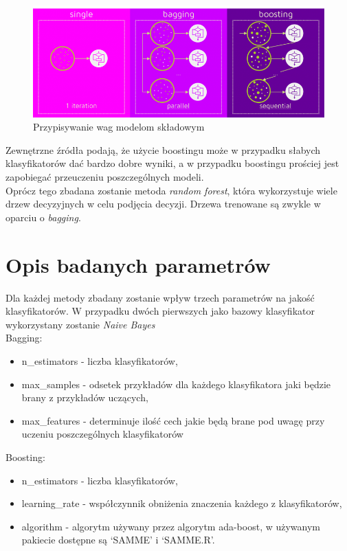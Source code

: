 \documentclass[12pt,a4paper]{article}
\begin{document}
\begin{figure}[H]
\centering
\includegraphics[scale=0.6]{choseWorks.png}
\caption{Przypisywanie wag modelom składowym}
\end{figure}
Zewnętrzne źródła podają, że użycie boostingu może w przypadku słabych klasyfikatorów dać bardzo dobre wyniki, a w przypadku boostingu prościej jest zapobiegać przeuczeniu poszczególnych modeli.\\
Oprócz tego zbadana zostanie metoda \textit{random forest}, która wykorzystuje wiele drzew decyzyjnych w celu podjęcia decyzji. Drzewa trenowane są zwykle w oparciu o \textit{bagging}.

\section{Opis badanych parametrów}
Dla każdej metody zbadany zostanie wpływ trzech parametrów na jakość klasyfikatorów. W przypadku dwóch pierwszych jako bazowy klasyfikator wykorzystany zostanie \textit{Naive Bayes}\\

Bagging:
\begin{itemize}
  \item n\_estimators - liczba klasyfikatorów,
  \item max\_samples  - odsetek przykładów dla każdego klasyfikatora jaki będzie brany z przykładów uczących,
  \item max\_features  - determinuje ilość cech jakie będą brane pod uwagę przy uczeniu poszczególnych klasyfikatorów
\end{itemize}

Boosting:
\begin{itemize}
  \item n\_estimators  - liczba klasyfikatorów,
  \item learning\_rate   - współczynnik obniżenia znaczenia każdego z klasyfikatorów,
  \item algorithm - algorytm używany przez algorytm ada-boost, w używanym pakiecie dostępne są ‘SAMME’ i ‘SAMME.R’.
\end{itemize}
\end{document}
